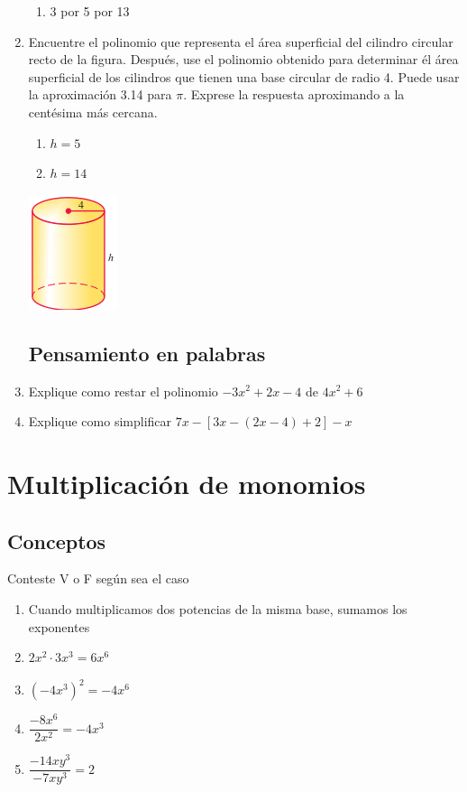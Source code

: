 \documentclass[letterpaper,11pt,twoside]{article}
\begin{document}
\begin{multicols}{2}
\begin{enumerate}
\begin{enumerate}
\item 3 por 5 por 13
\end{enumerate}
\item Encuentre el polinomio que representa el área superficial del cilindro circular recto de la figura. Después, use el polinomio obtenido para determinar él área superficial de los cilindros que tienen una base circular de radio 4. Puede usar la aproximación 3.14 para $\pi$. Exprese la respuesta aproximando a la centésima más cercana.
\begin{enumerate}
\item $h=5$
\item $h=14$
\end{enumerate}
\begin{center}
\includegraphics[scale=1]{Images/cilindro01.png} 
\end{center}
\subsection*{Pensamiento en palabras}
\item Explique como restar el polinomio $-3x^{2}+2x-4$ de $4x^{2}+6$
\item Explique como simplificar $7x-[3x-(2x-4)+2]-x$
 \end{enumerate}
 \section*{Multiplicaci\'{o}n de monomios}
 \subsection*{Conceptos}
 Conteste V o F seg\'{u}n sea el caso
 \begin{enumerate}
 \item Cuando multiplicamos dos potencias de la misma base, sumamos los exponentes
 \item $2x^{2}\cdot 3x^{3}=6x^{6}$
 \item $(-4x^{3})^{2}=-4x^{6}$
 \item $\dfrac{-8x^{6}}{2x^{2}}=-4x^{3}$
 \item $\dfrac{-14xy^{3}}{-7xy^{3}}=2$
 \end{enumerate}

\end{multicols}
\end{document}
